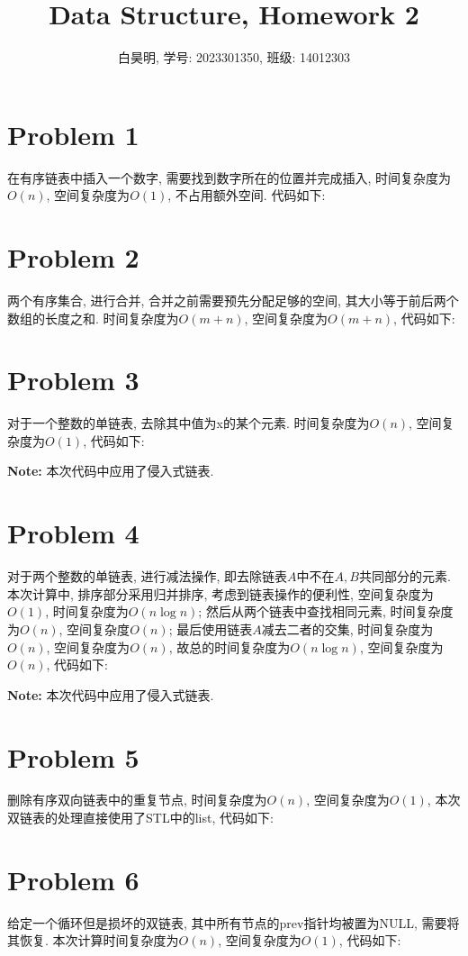\documentclass{ctexart}
\title{Data Structure, Homework 2}
\author{白昊明, 学号: 2023301350, 班级: 14012303}
\begin{document}
\maketitle
\section*{Problem 1}
在有序链表中插入一个数字, 需要找到数字所在的位置并完成插入, 时间复杂度为$O(n)$, 空间复杂度为$O(1)$, 不占用额外空间. 代码如下:


\section*{Problem 2}
两个有序集合, 进行合并, 合并之前需要预先分配足够的空间, 其大小等于前后两个数组的长度之和. 时间复杂度为$O(m+n)$, 空间复杂度为$O(m+n)$, 代码如下:


\section*{Problem 3}
对于一个整数的单链表, 去除其中值为x的某个元素. 时间复杂度为$O(n)$, 空间复杂度为$O(1)$, 代码如下:

\textbf{Note: }本次代码中应用了侵入式链表.

\section*{Problem 4}
对于两个整数的单链表, 进行减法操作, 即去除链表$A$中不在$A, B$共同部分的元素. 本次计算中, 排序部分采用归并排序, 考虑到链表操作的便利性, 空间复杂度为$O(1)$, 时间复杂度为$O(n\log n)$; 然后从两个链表中查找相同元素, 时间复杂度为$O(n)$, 空间复杂度$O(n)$; 最后使用链表$A$减去二者的交集, 时间复杂度为$O(n)$, 空间复杂度为$O(n)$, 故总的时间复杂度为$O(n\log n)$, 空间复杂度为$O(n)$, 代码如下:

\textbf{Note: }本次代码中应用了侵入式链表.

\section*{Problem 5}
删除有序双向链表中的重复节点, 时间复杂度为$O(n)$, 空间复杂度为$O(1)$, 本次双链表的处理直接使用了STL中的list, 代码如下:


\section*{Problem 6}
给定一个循环但是损坏的双链表, 其中所有节点的prev指针均被置为NULL, 需要将其恢复. 本次计算时间复杂度为$O(n)$, 空间复杂度为$O(1)$, 代码如下:

\end{document}
